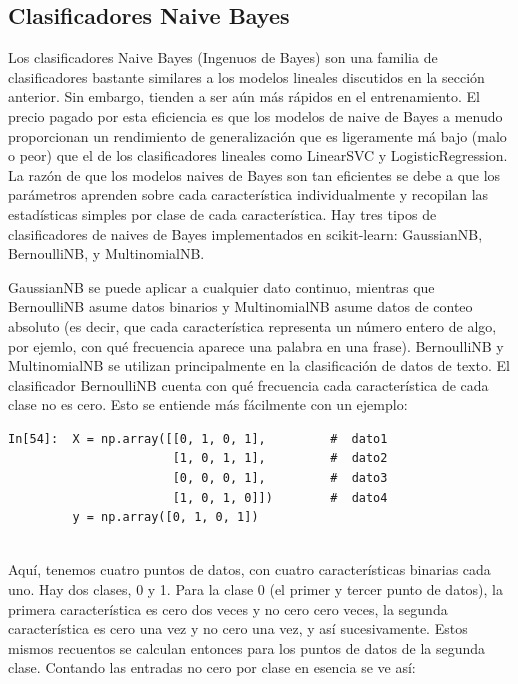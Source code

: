 {\subsection{Clasificadores  Naive   Bayes} 


Los clasificadores Naive Bayes   (Ingenuos de Bayes) son una familia de clasificadores bastante similares a los  modelos lineales  discutidos en la sección anterior.  Sin embargo, tienden a ser aún más rápidos en el entrenamiento. El precio pagado por esta eficiencia es que los modelos de  naive de Bayes  a menudo proporcionan un rendimiento de generalización que es ligeramente má bajo (malo o peor) que el de los clasificadores lineales como {\ttfamily LinearSVC} y {\ttfamily LogisticRegression}.  La razón de que los modelos naives de Bayes   son tan eficientes se debe a que los parámetros aprenden sobre cada característica individualmente y recopilan las estadísticas simples por clase de cada característica. Hay tres tipos de clasificadores de naives de Bayes  implementados en {\ttfamily  scikit-learn}: 
 GaussianNB, BernoulliNB, y MultinomialNB. 
 
 GaussianNB se puede aplicar a 	cualquier dato continuo, mientras que BernoulliNB asume datos binarios y MultinomialNB asume datos de conteo absoluto (es decir, que cada característica representa un número entero de algo, por ejemlo, con qué frecuencia aparece una palabra en una frase).  BernoulliNB y MultinomialNB se utilizan principalmente en la clasificación de datos de texto. El clasificador BernoulliNB cuenta con qué frecuencia cada característica de cada clase no es cero. Esto se entiende más fácilmente con un ejemplo: \\
 
	
\begin{lstlisting}
In[54]:  X = np.array([[0, 1, 0, 1],         #  dato1
                       [1, 0, 1, 1],         #  dato2
                       [0, 0, 0, 1],         #  dato3
                       [1, 0, 1, 0]])        #  dato4   
         y = np.array([0, 1, 0, 1])
	 
\end{lstlisting}
Aquí, tenemos cuatro puntos de datos, con cuatro características binarias cada uno. Hay dos clases, 0 y 1. Para la clase 0 (el primer y tercer punto de datos), la primera característica es cero dos veces y no cero cero veces, la segunda característica es cero una vez y no cero una vez, y así sucesivamente. Estos mismos recuentos se calculan entonces para los puntos de datos de la segunda clase. Contando las entradas no cero por clase en esencia se ve así:\\

}
